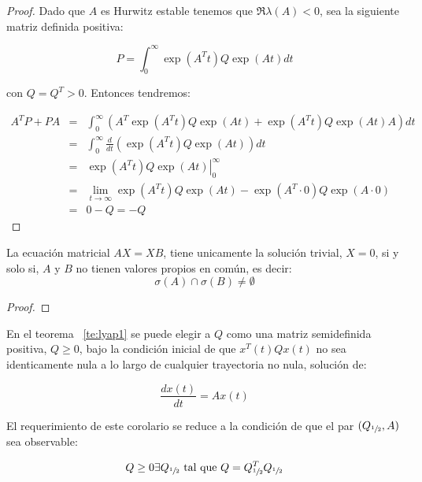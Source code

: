 \begin{proof}
        Dado que $A$ es Hurwitz estable tenemos que $\Re{\lambda(A)} < 0$, sea la siguiente matriz definida positiva:

        \begin{equation*}
            P = \int_0^{\infty} \exp{(A^Tt)} Q \exp(At) dt
        \end{equation*}

        con $Q = Q^T > 0$. Entonces tendremos:

        \begin{eqnarray*}
            A^T P + P A & = & \int_0^{\infty} \left( A^T \exp{(A^T t)} Q \exp{(At)} + \exp{(A^T t)} Q \exp{(At)} A \right) dt \\
            & = & \int_0^{\infty} \frac{d}{dt} \left( \exp{(A^T t)} Q \exp{(At)} \right) dt \\
            & = & \left. \exp{(A^T t)} Q \exp{(At)} \right|_0^{\infty} \\
            & = & \lim_{t \to \infty} \exp{(A^T t)} Q \exp{(At)} - \exp{(A^T \cdot 0)} Q \exp{(A \cdot 0)} \\
            & = & 0 - Q = - Q
        \end{eqnarray*}
    \end{proof}

    \begin{lema}
        La ecuación matricial $A X = X B$, tiene unicamente la solución trivial, $X=0$, si y solo si, $A$ y $B$ no tienen valores propios en común, es decir:
        \begin{equation*}
            \sigma(A) \cap \sigma(B) \ne \emptyset
        \end{equation*}
    \end{lema}

    \begin{proof}
    \end{proof}

    \begin{corolario}
        En el teorema ~\ref{te:lyap1} se puede elegir a $Q$ como una matriz semidefinida positiva, $Q \ge 0$, bajo la condición inicial de que $x^T(t) Q x(t)$ no sea identicamente nula a lo largo de cualquier trayectoria no nula, solución de:

        \begin{equation*}
            \frac{d x(t)}{dt} = A x(t)
        \end{equation*}

        El requerimiento de este corolario se reduce a la condición  de que el par $(Q_{\sfrac{1}{2}}, A)$ sea observable:

        \begin{equation*}
            Q \ge 0 \exists Q_{\sfrac{1}{2}} \text{ tal que } Q = Q_{\sfrac{1}{2}}^T Q_{\sfrac{1}{2}}
        \end{equation*}
    \end{corolario}


